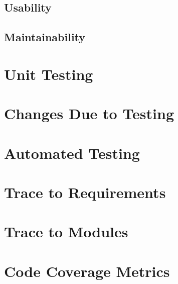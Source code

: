 \documentclass[12pt, titlepage]{article}
\begin{document}
\subsection{Usability}
		
\subsection{Maintainability}

\section{Unit Testing}

\section{Changes Due to Testing}

\section{Automated Testing}
		
\section{Trace to Requirements}
		
\section{Trace to Modules}		

\section{Code Coverage Metrics}
\end{document}
